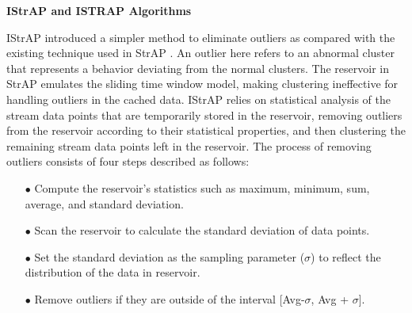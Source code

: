 



\textbf{IStrAP and ISTRAP Algorithms}

IStrAP introduced a simpler method to eliminate outliers as compared with the existing technique used in StrAP \cite{li2012improved}. An outlier here refers to an abnormal cluster that represents a behavior deviating from the normal clusters. The reservoir in StrAP emulates the sliding time window model, making clustering ineffective for handling outliers in the cached data. IStrAP relies on statistical analysis of the stream data points that are temporarily stored in the reservoir, removing outliers from the reservoir according to their statistical properties, and then clustering the remaining stream data points left in the reservoir. The process of removing outliers consists of four steps described as follows:





\begin{itemize}
    \item[$\bullet$]  Compute the reservoir's statistics such as maximum, minimum, sum, average, and standard deviation.
    \item[$\bullet$] Scan the reservoir to calculate the standard deviation of data points.
    \item[$\bullet$]  Set the standard deviation as the sampling parameter ($\sigma$) to reflect the distribution of the data in reservoir.
    \item[$\bullet$] Remove outliers if they are outside of the interval [Avg-$\sigma$, Avg + $\sigma$].
\end{itemize}

